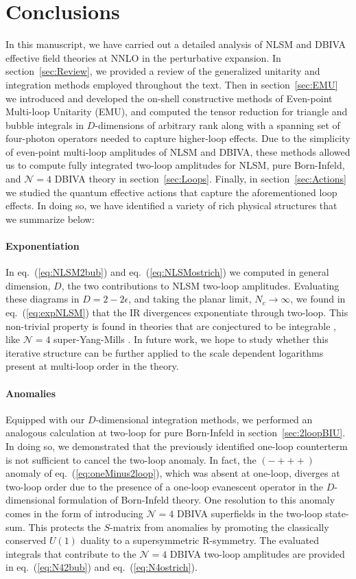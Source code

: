 \documentclass[11pt,letter]{article}
\def\sect#1{section~\ref{#1}}
\def\eqn#1{eq.~(\ref{#1})}
\begin{document}
\section{Conclusions}\label{sec:Discussion}
In this manuscript, we have carried out a detailed analysis of NLSM and DBIVA effective field theories at NNLO in the perturbative expansion. In \sect{sec:Review}, we provided a review of the generalized unitarity and integration methods employed throughout the text. Then in \sect{sec:EMU} we introduced and developed the on-shell constructive methods of Even-point Multi-loop Unitarity (EMU), and computed the tensor reduction for triangle and bubble integrals in $D$-dimensions of arbitrary rank along with a spanning set of four-photon operators needed to capture higher-loop effects. Due to the simplicity of even-point multi-loop amplitudes of NLSM and DBIVA, these methods allowed us to compute fully integrated two-loop amplitudes for NLSM, pure Born-Infeld, and $\mathcal{N}=4$ DBIVA theory in \sect{sec:Loops}. Finally, in \sect{sec:Actions} we studied the quantum effective actions that capture the aforementioned loop effects. In doing so, we have identified a variety of rich physical structures that we summarize below: 
\paragraph{\textbf{Exponentiation}} In \eqn{eq:NLSM2bub} and \eqn{eq:NLSMostrich} we computed in general dimension, $D$, the two contributions to NLSM two-loop amplitudes. Evaluating these diagrams in $D=2-2\epsilon$, and taking the planar limit, $N_c \rightarrow \infty$, we found in \eqn{eq:expNLSM} that the IR divergences exponentiate through two-loop. This non-trivial property is found in theories that are conjectured to be integrable \cite{Shankar:1977cm,Zamolodchikov:1977nu,Zamolodchikov:1978xm, Komatsu:2019hgc}, like $\mathcal{N}=4$ super-Yang-Mills \cite{Anastasiou:2003kj,Bern:2005iz}. In future work, we hope to study whether this iterative structure can be further applied to the scale dependent logarithms present at multi-loop order in the theory. 
\paragraph{\textbf{Anomalies}} Equipped with our $D$-dimensional integration methods, we performed an analogous calculation at two-loop for pure Born-Infeld in \sect{sec:2loopBIU}. In doing so, we demonstrated that the previously identified one-loop counterterm is not sufficient to cancel the two-loop anomaly. In fact, the $(-+++)$ anomaly of \eqn{eq:oneMinus2loop}, which was absent at one-loop, diverges at two-loop order due to the presence of a one-loop evanescent operator in the $D$-dimensional formulation of Born-Infeld theory. One resolution to this anomaly comes in the form of introducing $\mathcal{N}=4$ DBIVA superfields in the two-loop state-sum. This protects the $S$-matrix from anomalies by promoting the classically conserved $U(1)$ duality to a supersymmetric R-symmetry. The evaluated integrals that contribute to the $\mathcal{N}=4$ DBIVA two-loop amplitudes are provided in \eqn{eq:N42bub} and \eqn{eq:N4ostrich}. 
\end{document}
